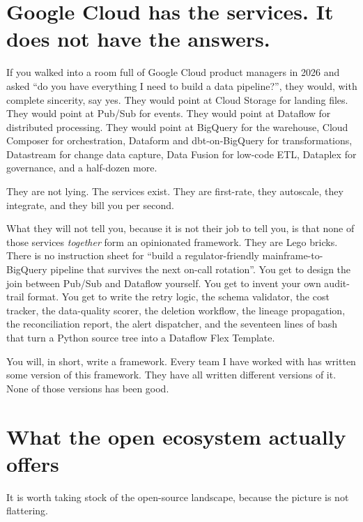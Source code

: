 \documentclass[
  11pt,
  british,
  oneside]{book}
\begin{document}
\hypertarget{google-cloud-has-the-services.-it-does-not-have-the-answers.}{%
\section{Google Cloud has the services. It does not have the
answers.}\label{google-cloud-has-the-services.-it-does-not-have-the-answers.}}

If you walked into a room full of Google Cloud product managers in 2026
and asked ``do you have everything I need to build a data pipeline?'',
they would, with complete sincerity, say yes. They would point at Cloud
Storage for landing files. They would point at Pub/Sub for events. They
would point at Dataflow for distributed processing. They would point at
BigQuery for the warehouse, Cloud Composer for orchestration, Dataform
and dbt-on-BigQuery for transformations, Datastream for change data
capture, Data Fusion for low-code ETL, Dataplex for governance, and a
half-dozen more.

They are not lying. The services exist. They are first-rate, they
autoscale, they integrate, and they bill you per second.

What they will not tell you, because it is not their job to tell you, is
that none of those services \emph{together} form an opinionated
framework. They are Lego bricks. There is no instruction sheet for
``build a regulator-friendly mainframe-to-BigQuery pipeline that
survives the next on-call rotation''. You get to design the join between
Pub/Sub and Dataflow yourself. You get to invent your own audit-trail
format. You get to write the retry logic, the schema validator, the cost
tracker, the data-quality scorer, the deletion workflow, the lineage
propagation, the reconciliation report, the alert dispatcher, and the
seventeen lines of bash that turn a Python source tree into a Dataflow
Flex Template.

You will, in short, write a framework. Every team I have worked with has
written some version of this framework. They have all written different
versions of it. None of those versions has been good.

\hypertarget{what-the-open-ecosystem-actually-offers}{%
\section{What the open ecosystem actually
offers}\label{what-the-open-ecosystem-actually-offers}}

It is worth taking stock of the open-source landscape, because the
picture is not flattering.
\end{document}
